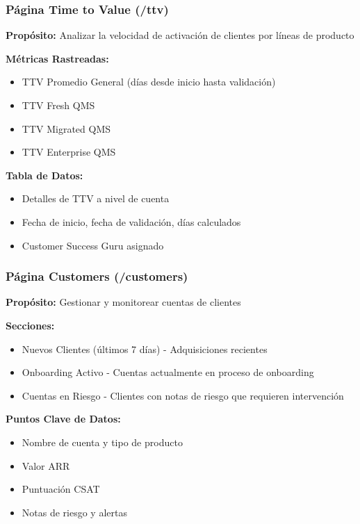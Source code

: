 \documentclass[12pt,a4paper]{article}
\begin{document}
\subsubsection{Página Time to Value (/ttv)}

\textbf{Propósito:} Analizar la velocidad de activación de clientes por líneas de producto

\textbf{Métricas Rastreadas:}
\begin{itemize}
    \item TTV Promedio General (días desde inicio hasta validación)
    \item TTV Fresh QMS
    \item TTV Migrated QMS
    \item TTV Enterprise QMS
\end{itemize}

\textbf{Tabla de Datos:}
\begin{itemize}
    \item Detalles de TTV a nivel de cuenta
    \item Fecha de inicio, fecha de validación, días calculados
    \item Customer Success Guru asignado
\end{itemize}

\subsubsection{Página Customers (/customers)}

\textbf{Propósito:} Gestionar y monitorear cuentas de clientes

\textbf{Secciones:}
\begin{itemize}
    \item Nuevos Clientes (últimos 7 días) - Adquisiciones recientes
    \item Onboarding Activo - Cuentas actualmente en proceso de onboarding
    \item Cuentas en Riesgo - Clientes con notas de riesgo que requieren intervención
\end{itemize}

\textbf{Puntos Clave de Datos:}
\begin{itemize}
    \item Nombre de cuenta y tipo de producto
    \item Valor ARR
    \item Puntuación CSAT
    \item Notas de riesgo y alertas
\end{itemize}
\end{document}
